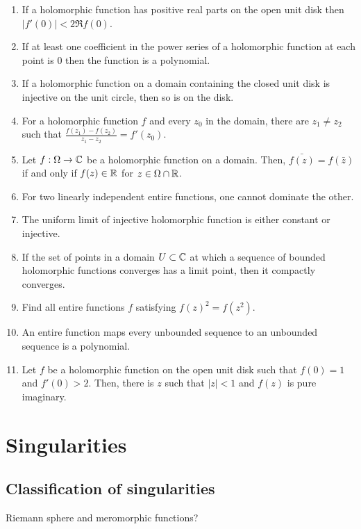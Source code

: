 \documentclass{../../large}
\begin{document}
\begin{enumerate}
\item If a holomorphic function has positive real parts on the open unit disk then $|f'(0)|<2\Re f(0)$.
\item If at least one coefficient in the power series of a holomorphic function at each point is 0 then the function is a polynomial.
\item If a holomorphic function on a domain containing the closed unit disk is injective on the unit circle, then so is on the disk.
\item For a holomorphic function $f$ and every $z_0$ in the domain, there are $z_1\ne z_2$ such that $\frac{f(z_1)-f(z_2)}{z_1-z_2}=f'(z_0)$.
\item Let $f:\Omega\to\mathbb{C}$ be a holomorphic function on a domain. Then, $\bar{f(z)}=f(\bar z)$ if and only if $f(z)\in\mathbb{R}$ for $z\in\Omega\cap\mathbb{R}$.
\item For two linearly independent entire functions, one cannot dominate the other.
\item The uniform limit of injective holomorphic function is either constant or injective.
\item If the set of points in a domain $U\subset\mathbb{C}$ at which a sequence of bounded holomorphic functions converges has a limit point, then it compactly converges.
\item Find all entire functions $f$ satisfying $f(z)^2=f(z^2)$.
\item An entire function maps every unbounded sequence to an unbounded sequence is a polynomial.
\item Let $f$ be a holomorphic function on the open unit disk such that $f(0)=1$ and $f'(0)>2$. Then, there is $z$ such that $|z|<1$ and $f(z)$ is pure imaginary.
\end{enumerate}



\chapter{Singularities}

\section{Classification of singularities}
\begin{prb}
\end{prb}
\begin{prb}
\end{prb}
\begin{prb}
\end{prb}
\begin{prb}
\end{prb}
\begin{prb}
\end{prb}
Riemann sphere and meromorphic functions?
\end{document}
